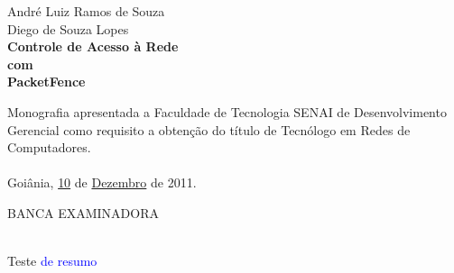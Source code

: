 \documentclass[brazil, ruledheader, pnumromarab,normaltoc]{abnt}
\begin{document}
\begin{folhadeaprovacao}
\setlength{\ABNTsignthickness}{0.4pt}
\setlength{\ABNTsignskip}{1cm}
\vspace*{0.2cm}
\begin{center}
\large André Luiz Ramos de Souza\\Diego de Souza Lopes\\
\vspace*{2cm}
\textbf{\LARGE Controle de Acesso à Rede\vspace{0.1cm}\\com\vspace{0.3cm}\\PacketFence}
\end{center}
\vspace*{1cm}
Monografia apresentada a Faculdade de Tecnologia SENAI de Desenvolvimento Gerencial como requisito a obtenção do título de Tecnólogo em Redes de Computadores.\\
\vspace*{0.2cm}\\
Goiânia, \uline{10}  de \uline{Dezembro} de 2011.\\
\begin{center}
BANCA EXAMINADORA
\end{center}
      
\end{folhadeaprovacao}
\sumario


\begin{resumo}
$\phantom{linha em branco}$\\
Teste \textcolor{blue}{de resumo}
\end{resumo}
\end{document}
